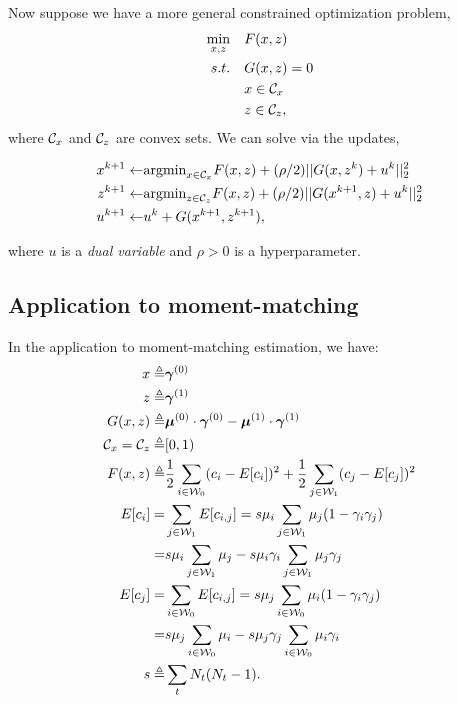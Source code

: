 Now suppose we have a more general constrained optimization problem, 
\begin{align}
\min_{x,z} & \quad F(x,z) \\
\notag
s.t.& \quad G(x,z) = 0\\
\notag
& \quad x \in \mathcal{C}_x\\
\notag
& \quad z \in \mathcal{C}_z,
\end{align}
where $\mathcal{C}_x$ and $\mathcal{C}_z$ are convex sets. We can solve via the updates,
\begin{small}
\begin{align}
x^{k+1} \gets & \text{argmin}_{x \in \mathcal{C}_x} F(x,z) + (\rho/2)||G(x,z^k) + u^k||_2^2\\
z^{k+1} \gets & \text{argmin}_{z \in \mathcal{C}_z} F(x,z) + (\rho/2)||G(x^{k+1},z) + u^k||_2^2\\
u^{k+1} \gets & u^k + G(x^{k+1},z^{k+1}),
\end{align}
\end{small}
where $u$ is a \emph{dual variable} and $\rho > 0$ is a hyperparameter.

\subsection{Application to moment-matching}
In the application to moment-matching estimation, we have:
\begin{align}
x \triangleq & \bm{\gamma}^{(0)}\\
z \triangleq & \bm{\gamma}^{(1)}\\
G(x,z) \triangleq & \bm{\mu}^{(0)} \cdot \bm{\gamma}^{(0)} - \bm{\mu}^{(1)} \cdot \bm{\gamma}^{(1)}
\label{eq:equality-constraint}
\\
\mathcal{C}_x = \mathcal{C}_z \triangleq & [0,1)\\
F(x,z) \triangleq & \frac{1}{2}\sum_{i\in \mathcal{W}_0}(c_i - E[c_i])^2 + \frac{1}{2}\sum_{j\in {\ensuremath{\mathcal{W}}}_1}(c_j - E[c_j])^2
\label{eq:objective}
\\
\notag
E[c_i] = & \sum_{j\in {\ensuremath{\mathcal{W}}}_1} E[c_{i,j}] =  s \mu_i \sum_{j\in {\ensuremath{\mathcal{W}}}_1} \mu_j (1-\gamma_i\gamma_j) \\
= & s \mu_i \sum_{j\in {\ensuremath{\mathcal{W}}}_1} \mu_j - s \mu_i \gamma_i \sum_{j\in {\ensuremath{\mathcal{W}}}_1} \mu_j \gamma_j\\
\notag
E[c_j] = & \sum_{i\in {\ensuremath{\mathcal{W}}}_0} E[c_{i,j}] = s \mu_j \sum_{i\in {\ensuremath{\mathcal{W}}}_0} \mu_i (1 - \gamma_i\gamma_j)\\
 = & s\mu_j \sum_{i\in {\ensuremath{\mathcal{W}}}_0} \mu_i - s \mu_j \gamma_j \sum_{i\in {\ensuremath{\mathcal{W}}}_0} \mu_i \gamma_i \\
s \triangleq & \sum_t N_t(N_t-1).
\end{align}

